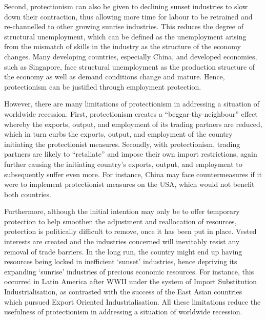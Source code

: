 \documentclass[11pt,a4paper]{article}
\begin{document}
Second, protectionism can also be given to declining sunset industries to slow down their contraction, thus allowing more time for labour to be retrained and re-channelled to other growing sunrise industries. This reduces the degree of structural unemployment, which can be defined as the unemployment arising from the mismatch of skills in the industry as the structure of the economy changes. Many developing countries, especially China, and developed economies, such as Singapore, face structural unemployment as the production structure of the economy as well as demand conditions change and mature. Hence, protectionism can be justified through employment protection. 

However, there are many limitations of protectionism in addressing a situation of worldwide recession. First, protectionism creates a “beggar-thy-neighbour” effect whereby the exports, output, and employment of its trading partners are reduced, which in turn curbs the exports, output, and employment of the country initiating the protectionist measures. Secondly, with protectionism, trading partners are likely to “retaliate” and impose their own import restrictions, again further causing the initiating country’s exports, output, and employment to subsequently suffer even more. For instance, China may face countermeasures if it were to implement protectionist measures on the USA, which would not benefit both countries. 

Furthermore, although the initial intention may only be to offer temporary protection to help smoothen the adjustment and reallocation of resources, protection is politically difficult to remove, once it has been put in place. Vested interests are created and the industries concerned will inevitably resist any removal of trade barriers. In the long run, the country might end up having resources being locked in inefficient ‘sunset’ industries, hence depriving its expanding ‘sunrise’ industries of precious economic resources. For instance, this occurred in Latin America after WWII under the system of Import Substitution Industrialisation, as contrasted with the success of the East Asian countries which pursued Export Oriented Industrialisation. All these limitations reduce the usefulness of protectionism in addressing a situation of worldwide recession. 
\end{document}
